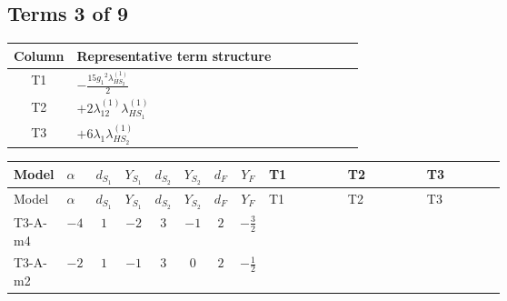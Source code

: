\documentclass[8pt]{article}
\begin{document}
\begin{landscape}
\subsection*{Terms 3 of 9}
\begin{center}
\begin{tabular}{@{}c >{\raggedright\arraybackslash}p{0.82\linewidth}@{}}
\toprule
Column & Representative term structure \\
\midrule
T1 & \(\displaystyle -\frac{15 {g_1}^2 {\lambda_{HS_2}^{(1)}}}{2}\) \\
\midrule
T2 & \(\displaystyle +2 {\lambda_{12}^{(1)}} {\lambda_{HS_1}^{(1)}}\) \\
\midrule
T3 & \(\displaystyle +6 {\lambda_1} {\lambda_{HS_2}^{(1)}}\) \\
\midrule
\bottomrule
\end{tabular}
\end{center}
\smallskip
\tiny
\begin{longtable}{@{}llcccccc >{\raggedright\arraybackslash}p{0.21\linewidth} >{\raggedright\arraybackslash}p{0.21\linewidth} >{\raggedright\arraybackslash}p{0.21\linewidth}@{}}
\toprule
Model & $\alpha$ & $d_{S_1}$ & $Y_{S_1}$ & $d_{S_2}$ & $Y_{S_2}$ & $d_F$ & $Y_F$ & T1 & T2 & T3 \\
\midrule
\endfirsthead
\toprule
Model & $\alpha$ & $d_{S_1}$ & $Y_{S_1}$ & $d_{S_2}$ & $Y_{S_2}$ & $d_F$ & $Y_F$ & T1 & T2 & T3 \\
\midrule
\endhead
T3-A-m4 & $-4$ & $1$ & $-2$ & $3$ & $-1$ & $2$ & $-\frac{3}{2}$ & \scriptsize\adjustbox{max width=\linewidth}{$\begin{gathered} -\frac{15 {g_1}^2 {\lambda_{HS_2}^{(1)}}}{2}\end{gathered}$} & \scriptsize\adjustbox{max width=\linewidth}{$\begin{gathered} +2 {\lambda_{12}^{(1)}} {\lambda_{HS_1}^{(1)}}\end{gathered}$} & \scriptsize\adjustbox{max width=\linewidth}{$\begin{gathered} +6 {\lambda_1} {\lambda_{HS_2}^{(1)}}\end{gathered}$} \\
\midrule
T3-A-m2 & $-2$ & $1$ & $-1$ & $3$ & $0$ & $2$ & $-\frac{1}{2}$ & \scriptsize\adjustbox{max width=\linewidth}{$\begin{gathered} -\frac{3 {g_1}^2 {\lambda_{HS_2}^{(1)}}}{2}\end{gathered}$} & \scriptsize\adjustbox{max width=\linewidth}{$\begin{gathered} +2 {\lambda_{12}^{(1)}} {\lambda_{HS_1}^{(1)}}\end{gathered}$} & \scriptsize\adjustbox{max width=\linewidth}{$\begin{gathered} +6 {\lambda_1} {\lambda_{HS_2}^{(1)}}\end{gathered}$} \\

\end{longtable}
\end{landscape}
\end{document}
